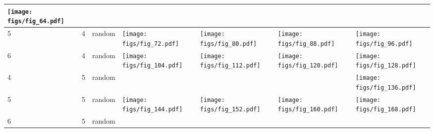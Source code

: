 \documentclass[oneside,canadian,landscape]{article}
\begin{document}
\begin{center}
\begin{longtable}{|l|l|l||l|l|l|l|}
\begin{minipage}{3.5cm}
\texttt{[image: figs/fig\_64.pdf]}
\end{minipage}
&\\ \hline
5&4&random&\begin{minipage}{3.5cm}
\texttt{[image: figs/fig\_72.pdf]}
\end{minipage}
&\begin{minipage}{3.5cm}
\texttt{[image: figs/fig\_80.pdf]}
\end{minipage}
&\begin{minipage}{3.5cm}
\texttt{[image: figs/fig\_88.pdf]}
\end{minipage}
&\begin{minipage}{3.5cm}
\texttt{[image: figs/fig\_96.pdf]}
\end{minipage}
\\ \hline
6&4&random&\begin{minipage}{3.5cm}
\texttt{[image: figs/fig\_104.pdf]}
\end{minipage}
&\begin{minipage}{3.5cm}
\texttt{[image: figs/fig\_112.pdf]}
\end{minipage}
&\begin{minipage}{3.5cm}
\texttt{[image: figs/fig\_120.pdf]}
\end{minipage}
&\begin{minipage}{3.5cm}
\texttt{[image: figs/fig\_128.pdf]}
\end{minipage}
\\ \hline
4&5&random&&&&\begin{minipage}{3.5cm}
\texttt{[image: figs/fig\_136.pdf]}
\end{minipage}
\\ \hline
5&5&random&\begin{minipage}{3.5cm}
\texttt{[image: figs/fig\_144.pdf]}
\end{minipage}
&\begin{minipage}{3.5cm}
\texttt{[image: figs/fig\_152.pdf]}
\end{minipage}
&\begin{minipage}{3.5cm}
\texttt{[image: figs/fig\_160.pdf]}
\end{minipage}
&\begin{minipage}{3.5cm}
\texttt{[image: figs/fig\_168.pdf]}
\end{minipage}
\\ \hline
6&5&random&&\begin{minipage}{3.5cm}

\end{minipage}
\end{longtable}
\end{center}
\end{document}
